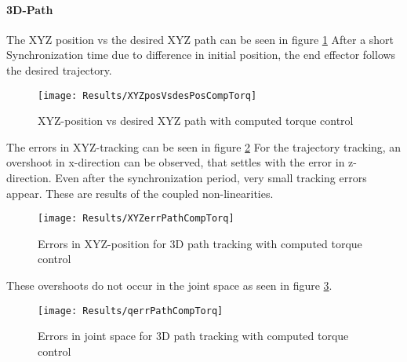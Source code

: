 
\paragraph{3D-Path}

The XYZ position vs the desired XYZ path can be seen in figure \ref{fig:XYZposVsdesPosCompTorq}%
After a short Synchronization time due to difference in initial position, the end effector follows the desired trajectory.
\begin{figure}[H]
	\texttt{[image: Results/XYZposVsdesPosCompTorq]}
	\caption{XYZ-position vs desired XYZ path with computed torque control}
	\label{fig:XYZposVsdesPosCompTorq}
\end{figure}
The errors in XYZ-tracking can be seen in figure \ref{fig:XYZerrPathCompTorq} %
For the trajectory tracking, an overshoot in x-direction can be observed, that settles with the error in z-direction. 
Even after the synchronization period, very small tracking errors appear. These are results of the coupled non-linearities.
\begin{figure}[H]
	\texttt{[image: Results/XYZerrPathCompTorq]}
	\caption{Errors in XYZ-position for 3D path tracking with computed torque control}
	\label{fig:XYZerrPathCompTorq}
\end{figure}

These overshoots do not occur in the joint space as seen in figure \ref{fig:qerrPathCompTorq}.
\begin{figure}[H]
	\texttt{[image: Results/qerrPathCompTorq]}
	\caption{Errors in joint space for 3D path tracking with computed torque control}
	\label{fig:qerrPathCompTorq}
\end{figure}




